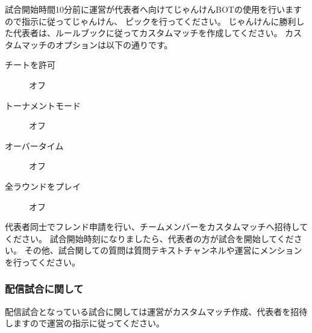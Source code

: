 \documentclass[uplatex,dvipdfmx]{jsarticle}
\begin{document}
	        試合開始時間10分前に運営が代表者へ向けてじゃんけんBOTの使用を行いますので指示に従ってじゃんけん、
	        ピックを行ってください。
	        じゃんけんに勝利した代表者は、ルールブックに従ってカスタムマッチを作成してください。
	        カスタムマッチのオプションは以下の通りです。
	        \begin{description}
	            \item[チートを許可] オフ
	            \item[トーナメントモード] オフ
	            \item[オーバータイム] オフ
	            \item[全ラウンドをプレイ] オフ
	        \end{description}
	        代表者同士でフレンド申請を行い、チームメンバーをカスタムマッチへ招待してください。
	        試合開始時刻になりましたら、代表者の方が試合を開始してください。
	        その他、試合関しての質問は質問テキストチャンネルや運営にメンションを行ってください。

	    \subsubsection{配信試合に関して}
	        配信試合となっている試合に関しては運営がカスタムマッチ作成、代表者を招待しますので運営の指示に従ってください。

\end{document}
